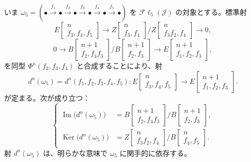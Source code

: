 いま
$\omega_5=(\mathord\bullet\xrightarrow{f_1}\mathord\bullet
\xrightarrow{f_2}\mathord\bullet\xrightarrow{f_3}\mathord\bullet
\xrightarrow{f_4}\mathord\bullet\xrightarrow{f_5}\mathord\bullet)$
を $\mathcal{F}\ell_5(\mathcal J)$ の対象とする。標準射
\[
E\!\begin{bmatrix}n\\ f_3,f_4,f_5\end{bmatrix}
\longrightarrow
Z\!\begin{bmatrix}n\\ f_3,f_4\end{bmatrix}
 \Big/
Z\!\begin{bmatrix}n\\ f_3f_2,f_4\end{bmatrix}
\longrightarrow0,
\]
\[
0\longrightarrow
B\!\begin{bmatrix}n+1\\ f_2,f_4f_3\end{bmatrix}
 \Big/
B\!\begin{bmatrix}n+1\\ f_2,f_3\end{bmatrix}
\longrightarrow
E\!\begin{bmatrix}n+1\\ f_1,f_2,f_3\end{bmatrix},
\]
を同型 $\Phi^n(f_2,f_3,f_4)$ と合成することにより、射
\[
d^n(\omega_5)=d^n(f_1,f_2,f_3,f_4,f_5)\colon
E\!\begin{bmatrix}n\\ f_3,f_4,f_5\end{bmatrix}
\longrightarrow
E\!\begin{bmatrix}n+1\\ f_1,f_2,f_3\end{bmatrix}.
\tag{4.2.3.2}
\]
が定まる。次が成り立つ：
\[
\left\{
\begin{aligned}
\operatorname{Im}\bigl(d^n(\omega_5)\bigr)
 &=B\!\begin{bmatrix}n+1\\ f_2,f_4f_3\end{bmatrix}
   \Big/
   B\!\begin{bmatrix}n+1\\ f_2,f_3\end{bmatrix},\\[2pt]
\operatorname{Ker}\bigl(d^n(\omega_5)\bigr)
 &=Z\!\begin{bmatrix}n\\ f_3f_2,f_4\end{bmatrix}
   \Big/
   B\!\begin{bmatrix}n\\ f_4,f_5\end{bmatrix}.
\end{aligned}
\right.
\tag{4.2.3.3}
\]
射 $d^n(\omega_5)$ は、明らかな意味で $\omega_5$ に関手的に依存する。

